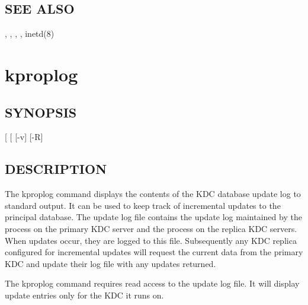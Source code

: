 \documentclass[letterpaper,10pt,english]{sphinxmanual}
\begin{document}
\subsection{SEE ALSO}
\label{\detokenize{admin/admin_commands/kpropd:see-also}}
{\hyperref[\detokenize{admin/admin_commands/kprop:kprop-8}]{}}, {\hyperref[\detokenize{admin/admin_commands/kdb5_util:kdb5-util-8}]{}}, {\hyperref[\detokenize{admin/admin_commands/krb5kdc:krb5kdc-8}]{}},
, inetd(8)


\section{kproplog}
\label{\detokenize{admin/admin_commands/kproplog:kproplog}}\label{\detokenize{admin/admin_commands/kproplog:kproplog-8}}\label{\detokenize{admin/admin_commands/kproplog::doc}}

\subsection{SYNOPSIS}
\label{\detokenize{admin/admin_commands/kproplog:synopsis}}
 {[}\sphinxstylestrong{-h}{]} {[} \sphinxstyleemphasis{num}{]} {[}-v{]}
 {[}-R{]}


\subsection{DESCRIPTION}
\label{\detokenize{admin/admin_commands/kproplog:description}}
The kproplog command displays the contents of the KDC database update
log to standard output.  It can be used to keep track of incremental
updates to the principal database.  The update log file contains the
update log maintained by the {\hyperref[\detokenize{admin/admin_commands/kadmind:kadmind-8}]{}} process on the primary
KDC server and the {\hyperref[\detokenize{admin/admin_commands/kpropd:kpropd-8}]{}} process on the replica KDC
servers.  When updates occur, they are logged to this file.
Subsequently any KDC replica configured for incremental updates will
request the current data from the primary KDC and update their log
file with any updates returned.

The kproplog command requires read access to the update log file.  It
will display update entries only for the KDC it runs on.
\end{document}
